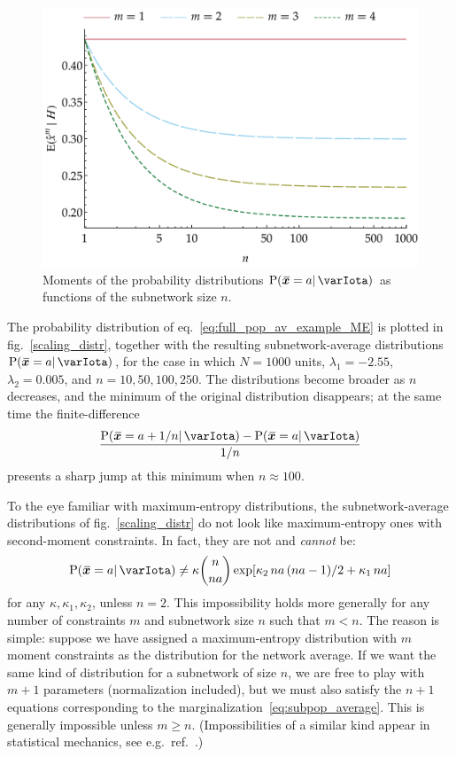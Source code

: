 \documentclass{article}
\theoremstyle{remark}
\theoremstyle{innote}
\newcommand*{\citep}{\parencites}
\renewcommand*{\|}{\mathpunct{|}}%
\renewcommand{\ge}{\geqslant}%
\newcommand*{\p}{\mathrm{P}}%
\newcommand*{\eqn}{eq.}%
\newcommand*{\fig}{fig.}%
\newcommand*{\eg}{{e.g.}}
\theoremstyle{simple}
\newcommand*{\widebar}[1]{{\mkern1.5mu\skew{2}\overline{\mkern-1.5mu#1\mkern-1.5mu}\mkern 1.5mu}}
\newcommand*{\sav}{\widebar} %
\newcommand*{\yxx}{x}%
\newcommand*{\yx}{\bm{\yxx}}%
\newcommand*{\yxs}{\sav{\yx}}%
\newcommand*{\yH}{\varIota}
\newcommand*{\yk}{\kappa}
\begin{document}
\begin{figure}[!b]
\centering
\includegraphics[width=0.95\columnwidth]{scaling_subpop_moments.pdf}%
\caption{Moments of the probability distributions $\p(\yxs =a \|
  \yH)$ as functions of the subnetwork size $n$.}
\label{scaling_moments}
\end{figure}

The probability distribution of \eqn~\eqref{eq:full_pop_av_example_ME} is
plotted in \fig~\ref{scaling_distr}, together with the resulting
subnetwork-average distributions $\p(\yxs = a \|\yH)$, for the case in
which $N = 1000$ units, $\lambda_1=-2.55$, $\lambda_2=0.005$, and
$n=10, 50, 100, 250$. The distributions become broader as $n$ decreases,
and the minimum of the original distribution disappears; at the same time
the finite-difference 
\[\frac{\p(\yxs=a+1/n\|\yH)-\p(\yxs=a\|\yH)}{1/n}\]
presents a sharp jump at this minimum when $n\approx 100$.

To the eye familiar with maximum-entropy distributions, the
subnetwork-average distributions of \fig~\ref{scaling_distr} do not look
like maximum-entropy ones with second-moment constraints. In fact,
they are not and \emph{cannot} be:
\begin{equation}
  \label{eq:maxent_form_sub}
  \p(\yxs =a  \| \yH)
\ne\kappa\binom{n}{n a}\exp[\yk_2\, n a\,(n a-1)/2 + \yk_1\, n a]
\end{equation}
for any $\kappa, \yk_1, \yk_2$, unless $n=2$. This impossibility holds more
generally for any number of constraints $m$ and subnetwork size $n$ such
that $m<n$. The reason is simple: suppose we have assigned a
maximum-entropy distribution with $m$ moment constraints as the
distribution for the network average. If we want the same kind of
distribution for a subnetwork of size $n$, we are free to play with $m+1$
parameters (normalization included), but we must also satisfy the $n+1$
equations corresponding to the marginalization~\eqref{eq:subpop_average}.
This is generally impossible unless $m \ge n$. (Impossibilities of a
similar kind appear in statistical mechanics, see \eg\
ref.~\citep{maesetal1999}.)
\end{document}
